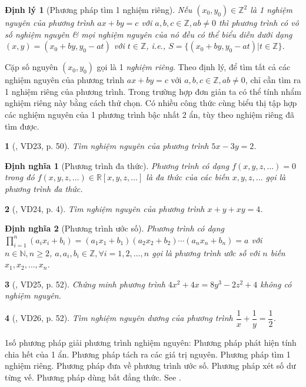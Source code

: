 \documentclass{article}
\newtheorem{baitoan}{}
\newtheorem{dinhly}{Định lý}
\newtheorem{dinhnghia}{Định nghĩa}
\begin{document}
\begin{dinhly}[Phương pháp tìm 1 nghiệm riêng]
	Nếu $(x_0,y_0)\in\mathbb{Z}^2$ là 1 nghiệm nguyên của phương trình $ax + by = c$ với $a,b,c\in\mathbb{Z},ab\ne0$ thì phương trình có vô số nghiệm nguyên \& mọi nghiệm nguyên của nó đều có thể biểu diễn dưới dạng $(x,y) = (x_0 + by,y_0 - at)$ với $t\in\mathbb{Z}$, i.e., $S = \{(x_0 + by,y_0 - at)|t\in\mathbb{Z}\}$.
\end{dinhly}
Cặp số nguyên $(x_0,y_0)$ gọi là 1 \textit{nghiệm riêng}. Theo định lý, để tìm tất cả các nghiệm nguyên của phương trình $ax + by = c$ với $a,b,c\in\mathbb{Z},ab\ne0$, chỉ cần tìm ra 1 nghiệm riêng của phương trình. Trong trường hợp đơn giản ta có thể tính nhẩm nghiệm riêng này bằng cách thử chọn. Có nhiều công thức cùng biểu thị tập hợp các nghiệm nguyên của 1 phương trình bậc nhất 2 ẩn, tùy theo nghiệm riêng đã tìm được.

\begin{baitoan}[\cite{Tuyen_Toan_9_old}, VD23, p. 50]
	Tìm nghiệm nguyên của phương trình $5x - 3y = 2$.
\end{baitoan}

\begin{dinhnghia}[Phương trình đa thức]
	Phương trình có dạng $f(x,y,z,\ldots) = 0$ trong đó $f(x,y,z,\ldots)\in\mathbb{R}[x,y,z,\ldots]$ là đa thức của các biến $x,y,z,\ldots$ gọi là {\rm phương trình đa thức}.
\end{dinhnghia}

\begin{baitoan}[\cite{Tuyen_Toan_9_old}, VD24, p. 4]
	Tìm nghiệm nguyên của phương trình $x + y + xy = 4$.
\end{baitoan}

\begin{dinhnghia}[Phương trình ước số]
	Phương trình có dạng $\prod_{i=1}^n (a_ix_i + b_i) = (a_1x_1 + b_1)(a_2x_2 + b_2)\cdots(a_nx_n + b_n) = a$ với $n\in\mathbb{N},n\ge2$, $a,a_i,b_i\in\mathbb{Z},\forall i = 1,2,\ldots,n$ gọi là {\rm phương trình ước số} với $n$ biến $x_1,x_2,\ldots,x_n$.
\end{dinhnghia}

\begin{baitoan}[\cite{Tuyen_Toan_9_old}, VD25, p. 52]
	Chứng minh phương trình $4x^2 + 4x = 8y^3 - 2z^2 + 4$ không có nghiệm nguyên.
\end{baitoan}

\begin{baitoan}[\cite{Tuyen_Toan_9_old}, VD26, p. 52]
	Tìm nghiệm nguyên dương của phương trình $\dfrac{1}{x} + \dfrac{1}{y} = \dfrac{1}{2}$.
\end{baitoan}
1số phương pháp giải phương trình nghiệm nguyên: Phương pháp phát hiện tính chia hết của 1 ẩn. Phương pháp tách ra các giá trị nguyên. Phương pháp tìm 1 nghiệm riêng. Phương pháp đưa về phương trình ước số. Phương pháp xét số dư từng vế. Phương pháp dùng bất đẳng thức. See \cite{Binh_PTNN}.
\end{document}
